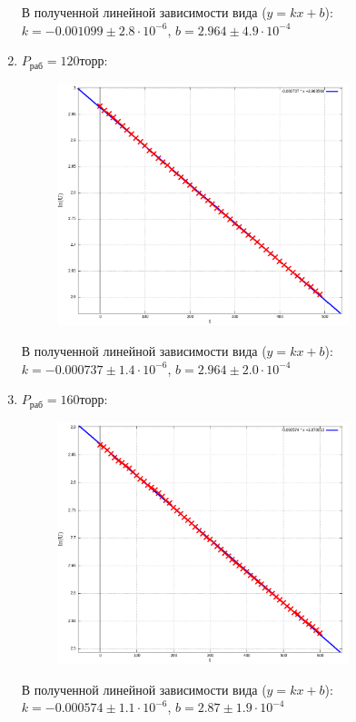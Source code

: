 \documentclass{article}
\begin{document}
\begin{enumerate}
    В полученной линейной зависимости вида ($y = kx + b$):\\
    $k = -0.001099 \pm 2.8\cdot 10^{-6}$, $b = 2.964 \pm 4.9\cdot10^{-4}$

    \item \textbf{$P_{\text{раб}} = 120\text{торр}$}:
    \begin{figure}[H]
        \centering
        \includegraphics[width=0.8\textwidth]{graph3.png}
    \end{figure}

    В полученной линейной зависимости вида ($y = kx + b$):\\
    $k = -0.000737 \pm 1.4\cdot 10^{-6}$, $b = 2.964 \pm 2.0\cdot10^{-4}$

    \item \textbf{$P_{\text{раб}} = 160\text{торр}$}:
    \begin{figure}[H]
        \centering
        \includegraphics[width=0.8\textwidth]{graph4.png}
    \end{figure}

    В полученной линейной зависимости вида ($y = kx + b$):\\
    $k = -0.000574 \pm 1.1\cdot 10^{-6}$, $b = 2.87 \pm 1.9\cdot10^{-4}$
\end{enumerate}
\end{document}
